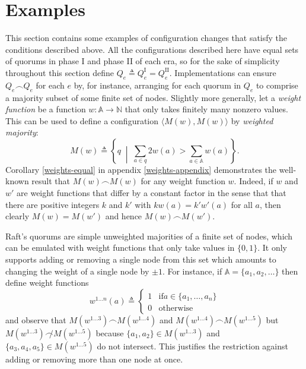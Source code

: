 \documentclass[journal]{IEEEtran}
\begin{document}
\section{Examples}\label{examples}

This section contains some examples of configuration changes that satisfy the
conditions described above.  All the configurations described here have equal
sets of quorums in phase I and phase II of each era, so for the sake of
simplicity throughout this section define ${Q_e \triangleq Q^\textrm{I}_e =
Q^\textrm{II}_e}$.  Implementations can ensure $Q_e \frown Q_e$ for each $e$
by, for instance, arranging for each quorum in $Q_e$ to comprise a majority
subset of some finite set of nodes. Slightly more generally, let a
\textit{weight function} be a function $w : \mathbb A \to \mathbb N$ that only
takes finitely many nonzero values. This can be used to define a configuration
$\langle M(w), M(w) \rangle$ by \textit{weighted majority}: \[M(w) \triangleq
  \left\{ q \;\middle|\; \sum_{a \in q} 2 w(a) > \sum_{a \in \mathbb A} w(a)
\right\}.\] Corollary \ref{weights-equal} in appendix \ref{weights-appendix}
demonstrates the well-known result that $M(w) \frown M(w)$ for any weight
function $w$.  Indeed, if $w$ and $w'$ are weight functions that differ by a
constant factor in the sense that that there are positive integers $k$ and $k'$
with $k w(a) = k' w'(a)$ for all $a$, then clearly ${M(w) = M(w')}$ and hence
$M(w) \frown M(w')$.

\def\wl#1{w^{1 \ldots #1}}
\def\Mwl#1{M(\wl{#1})}

Raft's quorums are simple unweighted majorities of a finite set of nodes, which
can be emulated with weight functions that only take values in $\{0, 1\}$. It
only supports adding or removing a single node from this set which amounts to
changing the weight of a single node by $\pm 1$. For instance, if $\mathbb A =
\{ a_1, a_2, \ldots \}$ then define weight functions \[\wl{n}(a) \triangleq
\begin{cases} 1 & \mathrm{if } a \in \{a_1, \ldots, a_n\} \\ 0 &
\mathrm{otherwise}\end{cases}\] and observe that ${\Mwl{3} \frown \Mwl{4}}$ and
${\Mwl{4} \frown \Mwl{5}}$ but ${\Mwl{3} \not\frown \Mwl{5}}$ because $\{a_1,
a_2\} \in \Mwl{3}$ and $\{a_3, a_4, a_5\} \in \Mwl{5}$ do not intersect. This
justifies the restriction against adding or removing more than one node at
once.
\end{document}
